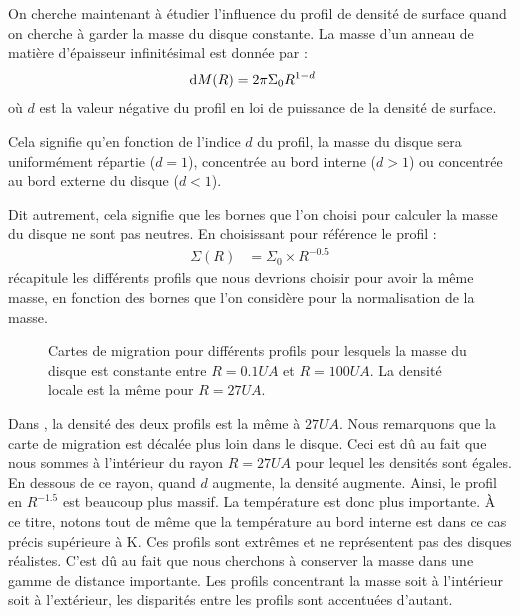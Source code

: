 On cherche maintenant à étudier l'influence du profil de densité de surface quand on cherche à garder la masse du disque constante. La masse d'un anneau de matière d'épaisseur infinitésimal est donnée par : 
\begin{align}
\operatorname{d \!} M(R) &= 2\pi \Sigma_0 R^{1-d}
\end{align}
où $d$ est la valeur négative du profil en loi de puissance de la densité de surface. 

Cela signifie qu'en fonction de l'indice $d$ du profil, la masse du disque sera uniformément répartie ($d=1$), concentrée au bord interne ($d>1$) ou concentrée au bord externe du disque ($d<1$). 

Dit autrement, cela signifie que les bornes que l'on choisi pour calculer la masse du disque ne sont pas neutres. En choisissant pour référence le profil : 
\begin{align}
\Sigma(R) &= \Sigma_0 \times R^{-0.5}
\end{align}
 récapitule les différents profils que nous devrions choisir pour avoir la même masse, en fonction des bornes que l'on considère pour la normalisation de la masse. 

\begin{figure}[htb]
\centering
{}\hfill
{}

\caption{Cartes de migration pour différents profils pour lesquels la masse du disque est constante entre $R=0.1\unit{UA}$ et $R=100\unit{UA}$. La densité locale est la même pour  $R=27\unit{UA}$. }\label{fig:map_mtot_01_100}
\end{figure}

Dans , la densité des deux profils est la même à $27\unit{UA}$. Nous remarquons que la carte de migration est décalée plus loin dans le disque. Ceci est dû au fait que nous sommes à l'intérieur du rayon $R=27\unit{UA}$ pour lequel les densités sont égales. En dessous de ce rayon, quand $d$ augmente, la densité augmente. Ainsi, le profil en $R^{-1.5}$ est beaucoup plus massif. La température est donc plus importante. À ce titre, notons tout de même que la température au bord interne est dans ce cas précis supérieure à  K. Ces profils sont extrêmes et ne représentent pas des disques réalistes. C'est dû au fait que nous cherchons à conserver la masse dans une gamme de distance importante. Les profils concentrant la masse soit à l'intérieur soit à l'extérieur, les disparités entre les profils sont accentuées d'autant. 

